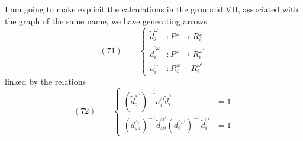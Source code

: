 I am going to make explicit the calculations in the groupoid $\overline{\underline{\mathrm{VII}}}$, associated with the graph of the same name, we have generating arrows
\[
(71)\qquad\left\{\begin{aligned}
\widetilde d_i^\omega&:P^\omega\longrightarrow R_i^\omega\\
\widetilde d_i^{\prime\omega}&:P^\omega\longrightarrow R_i^{\omega'}\\
a_i^\omega&:R_i^\omega\mathbin{-}R_i^{\omega'}
\end{aligned}\right.
\]
linked by the relations
\[
(72)\qquad\left\{\begin{aligned}
(\widetilde d_i^{\omega\prime})^{-1}a_i^\omega\widetilde d_i^\omega&=1\\
(d_{\omega i}^{\prime\omega})^{-1}\widetilde d_{\omega i}^{\omega'}(d_i^{\prime\omega'})^{-1}\widetilde d_i^\omega&=1
\end{aligned}\right.
\]
